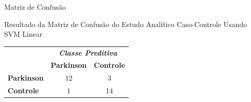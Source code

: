 \documentclass{beamer}
\begin{document}

\begin{frame}{Matriz de Confusão}
	\begin{block}{Resultado da Matriz de Confusão do Estudo Analítico Caso-Controle Usando SVM Linear}
\begin{table}[!htbp]
		\label{table:resultadomatrizconfusaosvm}
		\centering
		\begin{tabular}{l|c|c|}
		\cline{2-3}
		\multicolumn{1}{c}{}                         & \multicolumn{2}{|c|}{\textit{\textbf{Classe Preditiva}}} \\ \cline{2-3} 
																								 & \textbf{Parkinson}      & \textbf{Controle}         \\ \hline
		\multicolumn{1}{|l|}{\textbf{Parkinson}} & 12       & 3           \\ \hline
		\multicolumn{1}{|l|}{\textbf{Controle}}     & 1           & 14     \\ \hline
		\end{tabular}
\end{table}
	\end{block}
\end{frame}
\end{document}
